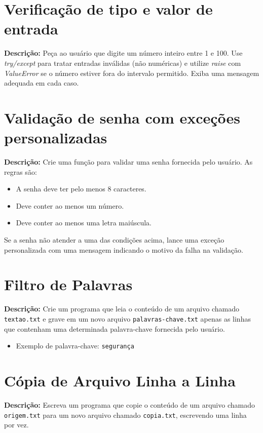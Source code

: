 \section{Verificação de tipo e valor de entrada}

\textbf{Descrição:}  
Peça ao usuário que digite um número inteiro entre 1 e 100. Use \textit{try/except} para tratar entradas inválidas (não numéricas) e utilize \textit{raise} com \textit{ValueError} se o número estiver fora do intervalo permitido. Exiba uma mensagem adequada em cada caso.


\section{Validação de senha com exceções personalizadas}

\textbf{Descrição:}  
Crie uma função para validar uma senha fornecida pelo usuário. As regras são:
\begin{itemize}
    \item A senha deve ter pelo menos 8 caracteres.
    \item Deve conter ao menos um número.
    \item Deve conter ao menos uma letra maiúscula.
\end{itemize}

Se a senha não atender a uma das condições acima, lance uma exceção personalizada com uma mensagem indicando o motivo da falha na validação.


\section{Filtro de Palavras}

\textbf{Descrição:}  
Crie um programa que leia o conteúdo de um arquivo chamado \texttt{textao.txt} e grave em um novo arquivo \texttt{palavras-chave.txt} apenas as linhas que contenham uma determinada palavra-chave fornecida pelo usuário. 

\begin{itemize}
    \item Exemplo de palavra-chave: \texttt{segurança}
\end{itemize}

\section{Cópia de Arquivo Linha a Linha}

\textbf{Descrição:}  
Escreva um programa que copie o conteúdo de um arquivo chamado \texttt{origem.txt} para um novo arquivo chamado \texttt{copia.txt}, escrevendo uma linha por vez.


